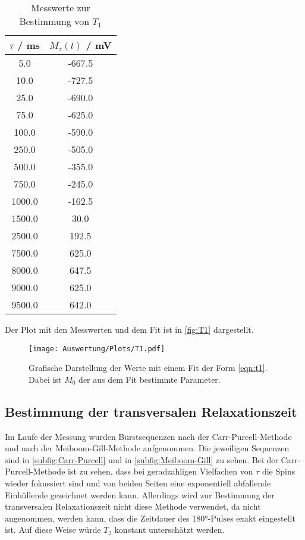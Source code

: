 \begin{table}
  \centering
  \caption{Messwerte zur Bestimmung von $T_1$}
  \label{tab:t1}
  \begin{tabular}{c c}
    \toprule
    $\tau$ / \si{\ms} & $M_z(t)$ / \si{\mV} \\
    \midrule
    5.0 & -667.5 \\
    10.0 & -727.5 \\
    25.0 & -690.0 \\
    75.0 & -625.0 \\
    100.0 & -590.0 \\
    250.0 & -505.0 \\
    500.0 & -355.0 \\
    750.0 & -245.0 \\
    1000.0 & -162.5 \\
    1500.0 & 30.0 \\
    2500.0 & 192.5 \\
    7500.0 & 625.0 \\
    8000.0 & 647.5 \\
    9000.0 & 625.0 \\
    9500.0 & 642.0 \\
    \bottomrule
  \end{tabular}
\end{table}
Der Plot mit den Messwerten und dem Fit ist in \autoref{fig:T1} dargestellt.

\begin{figure}
  \centering
  \texttt{[image: Auswertung/Plots/T1.pdf]}
  \caption{Grafische Darstellung der Werte mit einem Fit der Form
  \eqref{eqn:t1}. Dabei ist $M_0$ der aus dem Fit bestimmte Parameter.}
  \label{fig:T1}
\end{figure}

\subsection{Bestimmung der transversalen Relaxationszeit}
Im Laufe der Messung wurden Burstsequenzen nach der Carr-Purcell-Methode und
nach der Meiboom-Gill-Methode aufgenommen. Die jeweiligen Sequenzen sind in
\autoref{subfig:Carr-Purcell} und in \autoref{subfig:Meiboom-Gill} zu sehen.
Bei der Carr-Purcell-Methode ist zu sehen, dass bei geradzahligen Vielfachen von
$\tau$ die Spins wieder fokussiert sind und von beiden Seiten eine exponentiell
abfallende Einhüllende gezeichnet werden kann. Allerdings wird zur Bestimmung
der transversalen Relaxationszeit nicht diese Methode verwendet, da nicht angenommen,
werden kann, dass die Zeitdauer des 180°-Pulses exakt eingestellt ist. Auf diese
Weise würde $T_2$ konstant unterschätzt werden.

